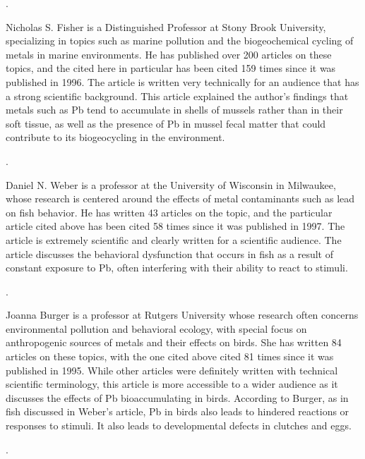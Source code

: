 \documentclass{article}
\begin{document}
\bigskip 

.
\bigskip

Nicholas S. Fisher is a Distinguished Professor at Stony Brook University, specializing in topics such as marine pollution and the biogeochemical cycling of metals in marine environments. He has published over 200 articles on these topics, and the cited here in particular has been cited 159 times since it was published in 1996. The article is written very technically for an audience that has a strong scientific background. This article explained the author's findings that metals such as Pb tend to accumulate in shells of mussels rather than in their soft tissue, as well as the presence of Pb in mussel fecal matter that could contribute to its biogeocycling in the environment.  

\bigskip 

.
\bigskip

Daniel N. Weber is a professor at the University of Wisconsin in Milwaukee, whose research is centered around the effects of metal contaminants such as lead on fish behavior. He has written 43 articles on the topic, and the particular article cited above has been cited 58 times since it was published in 1997. The article is extremely scientific and clearly written for a scientific audience. The article discusses the behavioral dysfunction that occurs in fish as a result of constant exposure to Pb, often interfering with their ability to react to stimuli. 

\bigskip 

.

Joanna Burger is a professor at Rutgers University whose research often concerns environmental pollution and behavioral ecology, with special focus on anthropogenic sources of metals and their effects on birds. She has written 84 articles on these topics, with the one cited above cited 81 times since it was published in 1995. While other articles were definitely written with technical scientific terminology, this article is more accessible to a wider audience as it discusses the effects of Pb bioaccumulating in birds. According to Burger, as in fish discussed in Weber's article, Pb in birds also leads to hindered reactions or responses to stimuli. It also leads to developmental defects in clutches and eggs. 

\bigskip

.

\bigskip
\end{document}
